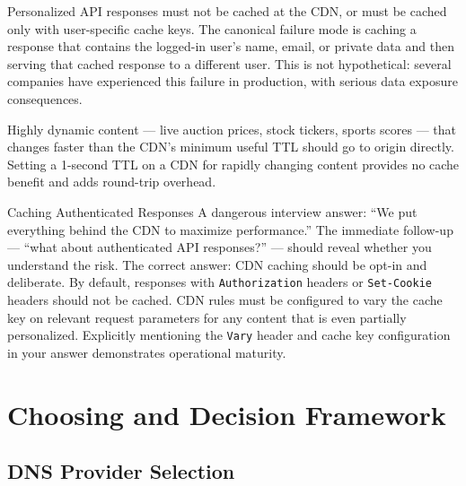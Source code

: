 \documentclass[11pt,a4paper]{article}
\begin{document}
Personalized API responses must not be cached at the CDN, or must be cached only with user-specific cache keys. The canonical failure mode is caching a response that contains the logged-in user's name, email, or private data and then serving that cached response to a different user. This is not hypothetical: several companies have experienced this failure in production, with serious data exposure consequences.

Highly dynamic content --- live auction prices, stock tickers, sports scores --- that changes faster than the CDN's minimum useful TTL should go to origin directly. Setting a 1-second TTL on a CDN for rapidly changing content provides no cache benefit and adds round-trip overhead.

\begin{trapbox}{Caching Authenticated Responses}
A dangerous interview answer: ``We put everything behind the CDN to maximize performance.'' The immediate follow-up --- ``what about authenticated API responses?'' --- should reveal whether you understand the risk. The correct answer: CDN caching should be opt-in and deliberate. By default, responses with \texttt{Authorization} headers or \texttt{Set-Cookie} headers should not be cached. CDN rules must be configured to vary the cache key on relevant request parameters for any content that is even partially personalized. Explicitly mentioning the \texttt{Vary} header and cache key configuration in your answer demonstrates operational maturity.
\end{trapbox}

\section{Choosing and Decision Framework}

\subsection{DNS Provider Selection}
\end{document}
